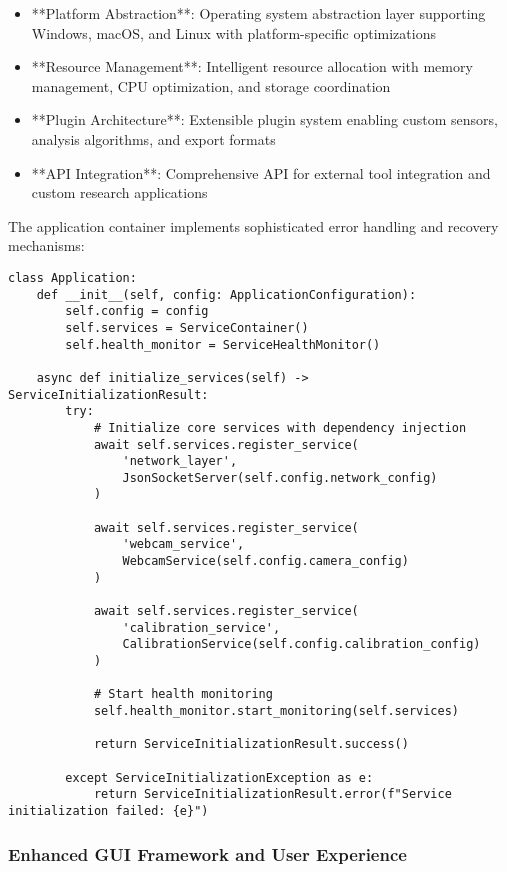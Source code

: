 \documentclass[12pt,a4paper]{article}
\begin{document}
\begin{itemize}
\item **Platform Abstraction**: Operating system abstraction layer supporting Windows, macOS, and Linux with
  platform-specific optimizations
\item **Resource Management**: Intelligent resource allocation with memory management, CPU optimization, and storage
  coordination
\item **Plugin Architecture**: Extensible plugin system enabling custom sensors, analysis algorithms, and export formats
\item **API Integration**: Comprehensive API for external tool integration and custom research applications

\end{itemize}
The application container implements sophisticated error handling and recovery mechanisms:

\begin{verbatim}
class Application:
    def __init__(self, config: ApplicationConfiguration):
        self.config = config
        self.services = ServiceContainer()
        self.health_monitor = ServiceHealthMonitor()

    async def initialize_services(self) -> ServiceInitializationResult:
        try:
            # Initialize core services with dependency injection
            await self.services.register_service(
                'network_layer',
                JsonSocketServer(self.config.network_config)
            )

            await self.services.register_service(
                'webcam_service',
                WebcamService(self.config.camera_config)
            )

            await self.services.register_service(
                'calibration_service',
                CalibrationService(self.config.calibration_config)
            )

            # Start health monitoring
            self.health_monitor.start_monitoring(self.services)

            return ServiceInitializationResult.success()

        except ServiceInitializationException as e:
            return ServiceInitializationResult.error(f"Service initialization failed: {e}")
\end{verbatim}

\subsubsection{Enhanced GUI Framework and User Experience}
\end{document}

